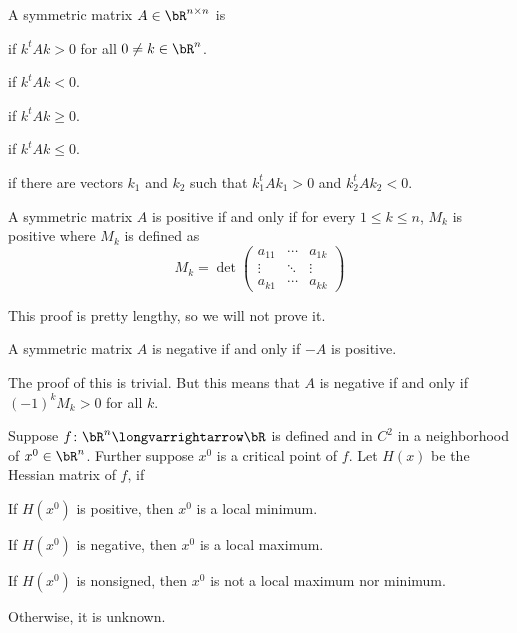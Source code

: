 \documentclass[10pt]{article}
\begin{document}


\bigskip

\begin{defn*}

    A symmetric matrix $A\in\bR^{n\times n}$ is 
    \benum
        \item {} if $k^tAk>0$ for all $0\neq k\in\bR^n$.
        \item {} if $k^tAk<0$.
        \item {} if $k^tAk\geq0$.
        \item {} if $k^tAk\leq0$.
        \item {} if there are vectors $k_1$ and $k_2$ such that $k_1^tAk_1>0$ and $k_2^tAk_2<0$.
    \eenum

\end{defn*}

\begin{prop*}

    A symmetric matrix $A$ is positive if and only if for every $1\leq k\leq n$, $M_k$ is positive where $M_k$ is defined as
    \[ M_k = \det\begin{pmatrix} a_{11} & \cdots & a_{1k} \\ \vdots & \ddots & \vdots \\ a_{k1} & \cdots & a_{kk} \end{pmatrix} \]

\end{prop*}

This proof is pretty lengthy, so we will not prove it.

\begin{prop*}

    A symmetric matrix $A$ is negative if and only if $-A$ is positive.
  
\end{prop*}

The proof of this is trivial.
But this means that $A$ is negative if and only if $(-1)^k M_k>0$ for all $k$.

\begin{prop*}

    Suppose $f\colon\bR^n\longvarrightarrow\bR$ is defined and in $C^2$ in a neighborhood of $x^0\in\bR^n$.
    Further suppose $x^0$ is a critical point of $f$.
    Let $H(x)$ be the Hessian matrix of $f$, if
    \benum
        \item If $H(x^0)$ is positive, then $x^0$ is a local minimum.
        \item If $H(x^0)$ is negative, then $x^0$ is a local maximum.
        \item If $H(x^0)$ is nonsigned, then $x^0$ is not a local maximum nor minimum.
        \item Otherwise, it is unknown.
    \eenum

\end{prop*}
\end{document}
